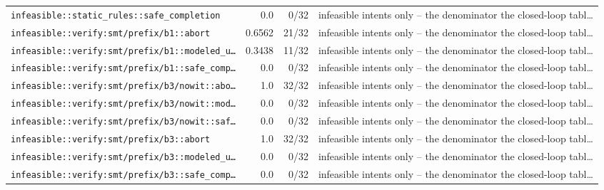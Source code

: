 \begin{center}
\begin{longtable}{@{}p{}rrp{}@{}}
\texttt{\scriptsize infeasible:\allowbreak :\allowbreak static\_\allowbreak rules:\allowbreak :\allowbreak safe\_\allowbreak completion} & 0.0 & 0/32 & infeasible intents only -- the denominator the closed-loop tabl… \\
\texttt{\scriptsize infeasible:\allowbreak :\allowbreak verify:\allowbreak smt/\allowbreak prefix/\allowbreak b1:\allowbreak :\allowbreak abort} & 0.6562 & 21/32 & infeasible intents only -- the denominator the closed-loop tabl… \\
\texttt{\scriptsize infeasible:\allowbreak :\allowbreak verify:\allowbreak smt/\allowbreak prefix/\allowbreak b1:\allowbreak :\allowbreak modeled\_\allowbreak u…} & 0.3438 & 11/32 & infeasible intents only -- the denominator the closed-loop tabl… \\
\texttt{\scriptsize infeasible:\allowbreak :\allowbreak verify:\allowbreak smt/\allowbreak prefix/\allowbreak b1:\allowbreak :\allowbreak safe\_\allowbreak comp…} & 0.0 & 0/32 & infeasible intents only -- the denominator the closed-loop tabl… \\
\texttt{\scriptsize infeasible:\allowbreak :\allowbreak verify:\allowbreak smt/\allowbreak prefix/\allowbreak b3/\allowbreak nowit:\allowbreak :\allowbreak abo…} & 1.0 & 32/32 & infeasible intents only -- the denominator the closed-loop tabl… \\
\texttt{\scriptsize infeasible:\allowbreak :\allowbreak verify:\allowbreak smt/\allowbreak prefix/\allowbreak b3/\allowbreak nowit:\allowbreak :\allowbreak mod…} & 0.0 & 0/32 & infeasible intents only -- the denominator the closed-loop tabl… \\
\texttt{\scriptsize infeasible:\allowbreak :\allowbreak verify:\allowbreak smt/\allowbreak prefix/\allowbreak b3/\allowbreak nowit:\allowbreak :\allowbreak saf…} & 0.0 & 0/32 & infeasible intents only -- the denominator the closed-loop tabl… \\
\texttt{\scriptsize infeasible:\allowbreak :\allowbreak verify:\allowbreak smt/\allowbreak prefix/\allowbreak b3:\allowbreak :\allowbreak abort} & 1.0 & 32/32 & infeasible intents only -- the denominator the closed-loop tabl… \\
\texttt{\scriptsize infeasible:\allowbreak :\allowbreak verify:\allowbreak smt/\allowbreak prefix/\allowbreak b3:\allowbreak :\allowbreak modeled\_\allowbreak u…} & 0.0 & 0/32 & infeasible intents only -- the denominator the closed-loop tabl… \\
\texttt{\scriptsize infeasible:\allowbreak :\allowbreak verify:\allowbreak smt/\allowbreak prefix/\allowbreak b3:\allowbreak :\allowbreak safe\_\allowbreak comp…} & 0.0 & 0/32 & infeasible intents only -- the denominator the closed-loop tabl… \\

\end{longtable}
\end{center}
